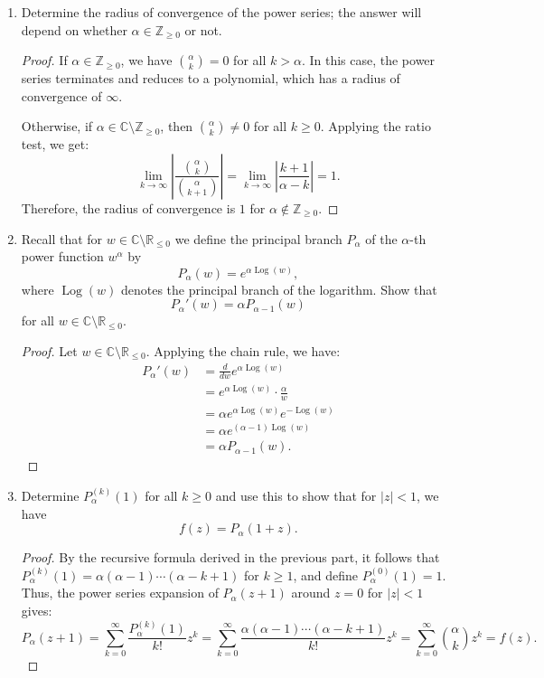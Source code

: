 \documentclass[a4paper,11pt]{article}
\newcommand{\Z}{\mathbb{Z}}
\newcommand{\R}{\mathbb{R}}
\newcommand{\C}{\mathbb{C}}
\begin{document}
\begin{enumerate}[label=\textbf{(\alph*)}]
    \item Determine the radius of convergence of the power series; the answer will depend on whether $\alpha\in\Z_{\ge0}$ or not.
    \begin{proof}
        If $\alpha\in\Z_{\ge0}$, we have $\binom{\alpha}{k} = 0$ for all $k>\alpha$. In this case, the power series terminates and reduces to a polynomial, which has a radius of convergence of $\infty$. 
        
        Otherwise, if $\alpha \in \C \setminus \Z_{\ge0}$, then $\binom{\alpha}{k} \neq 0$ for all $k \ge 0$. Applying the ratio test, we get:
        \[
            \lim_{k \to \infty} \left| \frac{\binom{\alpha}{k}}{\binom{\alpha}{k+1}} \right| 
            = \lim_{k \to \infty} \left| \frac{k+1}{\alpha - k} \right| = 1.
        \]
        Therefore, the radius of convergence is $1$ for $\alpha \notin \Z_{\ge0}$.
    \end{proof}

    
\item Recall that for $w\in\C\setminus\R_{\le0}$ we define the principal branch $P_{\alpha}$ of the $\alpha$-th power function $w^{\alpha}$ by 
    \[ P_{\alpha}(w)=e^{\alpha \operatorname{Log}(w)}, \]
    where $\operatorname{Log}(w)$ denotes the principal branch of the logarithm. Show that
    \[ P_{\alpha}'(w)=\alpha P_{\alpha-1}(w) \]
    for all $w\in\C\setminus\R_{\le0}$.
    \begin{proof}
        Let $w\in\C\setminus\R_{\le0}$. Applying the chain rule, we have:
        \begin{align*}
            P_{\alpha}'(w) &= \frac{d}{dw} e^{\alpha \operatorname{Log}(w)} \\
            &= e^{\alpha \operatorname{Log}(w)} \cdot \frac{\alpha}{w} \\
            &= \alpha e^{\alpha \operatorname{Log}(w)} e^{-\operatorname{Log}(w)} \\
            &= \alpha e^{(\alpha-1) \operatorname{Log}(w)} \\
            &= \alpha P_{\alpha-1}(w).
        \end{align*}
    \end{proof}
    
    \item Determine $P_{\alpha}^{(k)}(1)$ for all $k \ge 0$ and use this to show that for $|z|<1$, we have
    \[ f(z)=P_{\alpha}(1+z). \]
    \begin{proof}
        By the recursive formula derived in the previous part, it follows that $P_{\alpha}^{(k)}(1) = \alpha(\alpha - 1) \cdots (\alpha - k + 1)$ for $k \ge 1$, and define $P_{\alpha}^{(0)}(1) = 1$.
        Thus, the power series expansion of $P_{\alpha}(z+1)$ around $z = 0$ for $|z|<1$ gives:
        \[ 
            P_{\alpha}(z+1)
            = \sum_{k=0}^{\infty} \frac{P_{\alpha}^{(k)}(1)}{k!} z^k 
            = \sum_{k=0}^{\infty} \frac{\alpha(\alpha - 1) \cdots (\alpha - k + 1)}{k!} z^k
            = \sum_{k=0}^{\infty} \binom{\alpha}{k} z^k
            = f(z).
        \]
    \end{proof}
\end{enumerate}
\end{document}
